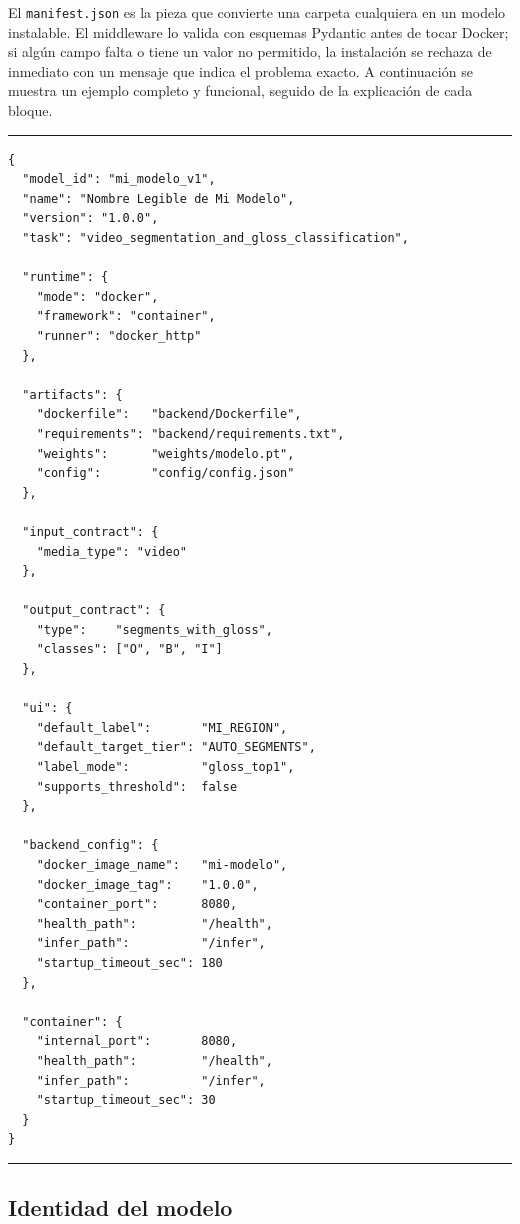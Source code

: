 \documentclass[12pt,a4paper]{article}
\begin{document}
El \texttt{manifest.json} es la pieza que convierte una carpeta cualquiera en un modelo instalable. El middleware lo valida con esquemas Pydantic antes de tocar Docker; si algún campo falta o tiene un valor no permitido, la instalación se rechaza de inmediato con un mensaje que indica el problema exacto. A continuación se muestra un ejemplo completo y funcional, seguido de la explicación de cada bloque.

\begin{center}
\begin{minipage}{0.92\textwidth}
\hrule
\vspace{0.06cm}
\footnotesize
\begin{Verbatim}[baselinestretch=0.75]
{
  "model_id": "mi_modelo_v1",
  "name": "Nombre Legible de Mi Modelo",
  "version": "1.0.0",
  "task": "video_segmentation_and_gloss_classification",

  "runtime": {
    "mode": "docker",
    "framework": "container",
    "runner": "docker_http"
  },

  "artifacts": {
    "dockerfile":   "backend/Dockerfile",
    "requirements": "backend/requirements.txt",
    "weights":      "weights/modelo.pt",
    "config":       "config/config.json"
  },

  "input_contract": {
    "media_type": "video"
  },

  "output_contract": {
    "type":    "segments_with_gloss",
    "classes": ["O", "B", "I"]
  },

  "ui": {
    "default_label":       "MI_REGION",
    "default_target_tier": "AUTO_SEGMENTS",
    "label_mode":          "gloss_top1",
    "supports_threshold":  false
  },

  "backend_config": {
    "docker_image_name":   "mi-modelo",
    "docker_image_tag":    "1.0.0",
    "container_port":      8080,
    "health_path":         "/health",
    "infer_path":          "/infer",
    "startup_timeout_sec": 180
  },

  "container": {
    "internal_port":       8080,
    "health_path":         "/health",
    "infer_path":          "/infer",
    "startup_timeout_sec": 30
  }
}
\end{Verbatim}
\vspace{0.03cm}
\hrule
{}
\end{minipage}
\end{center}

\subsection{Identidad del modelo}
\end{document}
